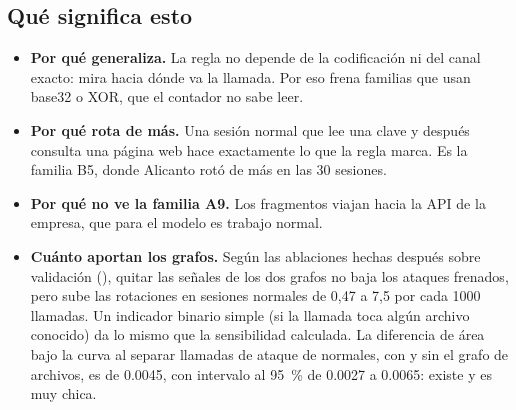 \subsection{Qué significa esto}

\begin{itemize}
  \item \textbf{Por qué generaliza.} La regla no depende de la codificación ni del canal exacto: mira
    hacia dónde va la llamada. Por eso frena familias que usan base32 o XOR, que el contador no sabe
    leer.
  \item \textbf{Por qué rota de más.} Una sesión normal que lee una clave y después consulta una
    página web hace exactamente lo que la regla marca. Es la familia B5, donde Alicanto rotó de más
    en las 30 sesiones.
  \item \textbf{Por qué no ve la familia A9.} Los fragmentos viajan hacia la API de la empresa, que
    para el modelo es trabajo normal.
  \item \textbf{Cuánto aportan los grafos.} Según las ablaciones hechas después sobre validación
    (), quitar las señales de los dos grafos no baja los ataques frenados,
    pero sube las rotaciones en sesiones normales de 0,47 a 7,5 por cada \num{1000} llamadas. Un
    indicador binario simple (si la llamada toca algún archivo conocido) da lo mismo que la
    sensibilidad calculada. La diferencia de área bajo la curva al separar llamadas de ataque de
    normales, con y sin el grafo de archivos, es de \num{0.0045}, con intervalo al \qty{95}{\percent}
    de \num{0.0027} a \num{0.0065}: existe y es muy chica.
\end{itemize}
